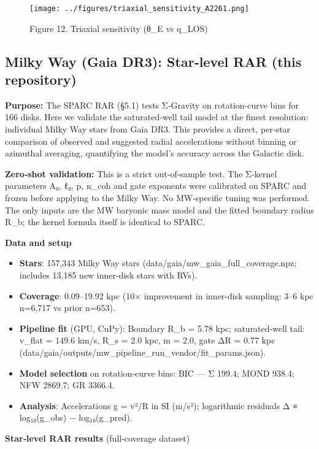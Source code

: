 \documentclass[11pt,a4paper]{article}
\begin{document}
\begin{figure}[h]
\centering
\texttt{[image: ../figures/triaxial\_sensitivity\_A2261.png]}
\caption{Figure 12. Triaxial sensitivity (θ_E vs q_LOS)}
\end{figure}


\subsection{Milky Way (Gaia DR3): Star‑level RAR (this repository)}


\textbf{Purpose:} The SPARC RAR (§5.1) tests Σ‑Gravity on rotation‑curve bins for 166 disks. Here we validate the saturated‑well tail model at the finest resolution: individual Milky Way stars from Gaia DR3. This provides a direct, per‑star comparison of observed and suggested radial accelerations without binning or azimuthal averaging, quantifying the model's accuracy across the Galactic disk.


\textbf{Zero‑shot validation:} This is a strict out‑of‑sample test. The Σ‑kernel parameters {A₀, ℓ₀, p, n\_coh} and gate exponents were calibrated on SPARC and frozen before applying to the Milky Way. No MW‑specific tuning was performed. The only inputs are the MW baryonic mass model and the fitted boundary radius R\_b; the kernel formula itself is identical to SPARC.


\textbf{Data and setup}

\begin{itemize}
\item \textbf{Stars}: 157,343 Milky Way stars (data/gaia/mw\_gaia\_full\_coverage.npz; includes 13,185 new inner-disk stars with RVs).
\item \textbf{Coverage}: 0.09–19.92 kpc (10× improvement in inner-disk sampling: 3–6 kpc n=6,717 vs prior n=653).
\item \textbf{Pipeline fit} (GPU, CuPy): Boundary R\_b = 5.78 kpc; saturated‑well tail: v\_flat = 149.6 km/s, R\_s = 2.0 kpc, m = 2.0, gate ΔR = 0.77 kpc (data/gaia/outputs/mw\_pipeline\_run\_vendor/fit\_params.json).
\item \textbf{Model selection} on rotation‑curve bins: BIC — Σ 199.4; MOND 938.4; NFW 2869.7; GR 3366.4.
\item \textbf{Analysis}: Accelerations g = v²/R in SI (m/s²); logarithmic residuals Δ ≡ log₁₀(g\_obs) − log₁₀(g\_pred).
\end{itemize}


\textbf{Star‑level RAR results} (full-coverage dataset)
\end{document}
